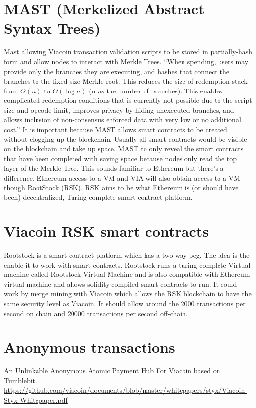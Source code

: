 \documentclass{article}
\begin{document}
\section{MAST (Merkelized Abstract Syntax Trees)} \label{MAST (Merkelized Abstract Syntax Trees)}
\cite{MAST}Mast allowing Viacoin transaction validation scripts to be stored in partially-hash
form and allow nodes to interact with Merkle Trees.
“When spending, users may provide only the branches they are executing, and
hashes that connect the branches to the fixed size Merkle root. This reduces the
size of redemption stack from $O(n)$ to $O(\log{}n)$ (n as the number of branches).
This enables complicated redemption conditions that is currently not possible
due to the script size and opcode limit, improves privacy by hiding unexecuted
branches, and allows inclusion of non-consensus enforced data with very low or
no additional cost.” \newline \newline \noindent
It is important because MAST allows smart contracts to be created without
clogging up the blockchain. Usually all smart contracts would be visible on the
blockchain and take up space. MAST to only reveal the smart contracts that have
been completed with saving space because nodes only read the top layer of the
Merkle Tree.
\noindent
This sounds familiar to Ethereum but there’s a difference. Ethereum access to a
VM and VIA will also obtain access to a VM though RootStock (RSK). RSK aims to
be what Ethereum is (or should have been) decentralized, Turing-complete smart
contract platform.

\section{Viacoin RSK smart contracts} \label{Viacoin RSK smart contracts}
\cite{rootstock}Rootstock is a smart contract platform which has a two-way peg. The idea is the
enable it to work with smart contracts. Rootstock runs a turing complete Virtual
machine called Rootstock Virtual Machine and is also compatible with Ethereum
virtual machine and allows solidity compiled smart contracts to run.
It could work by merge mining with Viacoin which allows the RSK blockchain to
have the same security level as Viacoin. It should allow around the 2000
transactions per second on chain and 20000 transactions per second off-chain.

\section{Anonymous transactions} \label{Anonymous transactions}
\cite{styx}An Unlinkable Anonymous Atomic Payment Hub For Viacoin based on Tumblebit.\newline
\url{https://github.com/viacoin/documents/blob/master/whitepapers/styx/Viacoin-Styx-Whitepaper.pdf}
\newpage
\printbibliography
\end{document}
